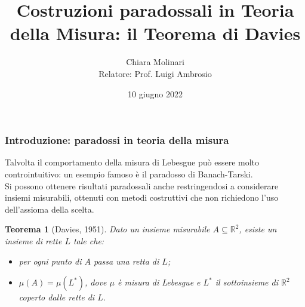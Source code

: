 \documentclass[11pt]{beamer} %
\author[Chiara Molinari]{Chiara Molinari\\[10mm] Relatore: Prof. Luigi Ambrosio}
\title[Il Teorema di Davies]{Costruzioni paradossali in Teoria della Misura: il Teorema di Davies}
\date{10 giugno 2022}
\newcommand{\R}{\mathbb{R}}
\newcommand{\<}{\langle}
\renewcommand{\>}{\rangle}
\theoremstyle{theorem}
\newtheorem{teo}{Teorema}
\theoremstyle{theorem}
\theoremstyle{theorem}
\theoremstyle{theorem}
\theoremstyle{theorem}
\begin{document}
\begin{frame}
	\maketitle
\end{frame}	

\begin{frame}[fragile]
	\frametitle{Introduzione: paradossi in teoria della misura}
	Talvolta il comportamento della misura di Lebesgue può essere molto controintuitivo: un esempio famoso è il paradosso di Banach-Tarski.\\
	\pause
	Si possono ottenere risultati paradossali anche restringendosi a considerare insiemi misurabili, ottenuti con metodi costruttivi che non richiedono l’uso dell'assioma della scelta.\\
	\pause
	
	\begin{teo}[Davies, 1951] Dato un insieme misurabile $A \subseteq \R^2$, esiste un insieme di rette $L$ tale che:\\
		\begin{itemize}	
			\item per ogni punto di $A$ passa una retta di $L$;\\
			\item $\mu(A)=\mu(L^*)$, dove $\mu$ è misura di Lebesgue e $L^*$ il sottoinsieme di $\R^2$ coperto dalle rette di $L$.\\
		\end{itemize}
	\end{teo}
 
\end{frame}



\end{document}
